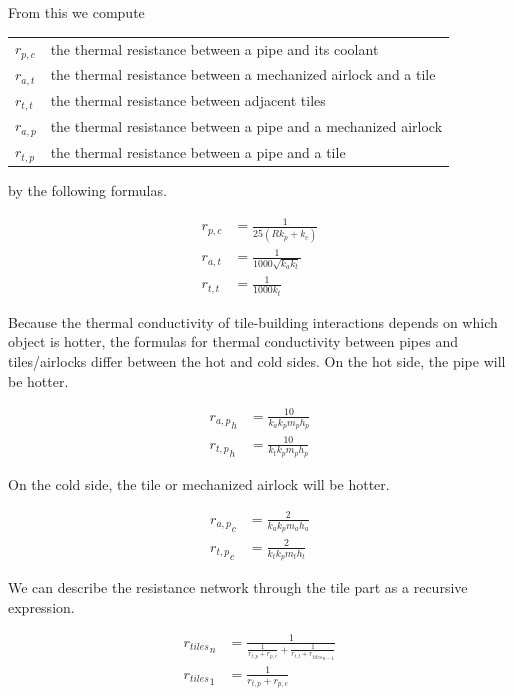 \documentclass{article}
\numberwithin{equation}{subsection}
\theoremstyle{remark}
\newenvironment{definitiontable}{
\renewcommand{\arraystretch}{1.5}
\begin{tabular}{lp{0.8\textwidth}}
}
{
\end{tabular}
\renewcommand{\arraystretch}{1.0}
}
\begin{document}
From this we compute

\begin{definitiontable}
\(r_{p,c}\) & the thermal resistance between a pipe and its coolant \\

\(r_{a,t}\) & the thermal resistance between a mechanized airlock and a tile \\

\(r_{t,t}\) & the thermal resistance between adjacent tiles \\

\(r_{a,p}\) & the thermal resistance between a pipe and a mechanized airlock \\

\(r_{t,p}\) & the thermal resistance between a pipe and a tile
\end{definitiontable}

by the following formulas.

\begin{align}
r_{p,c} &= \frac{1}{25 \left(R k_{p} + k_{c}\right)} \\
r_{a,t} &= \frac{1}{1000 \sqrt{k_{a} k_{t}}} \\
r_{t,t} &= \frac{1}{1000 k_{t}}
\end{align}

Because the thermal conductivity of tile-building interactions depends on which object is hotter, the formulas for thermal conductivity between pipes and tiles/airlocks differ between the hot and cold sides.
On the hot side, the pipe will be hotter.

\begin{align}
{r_{a,p}}_{h} &= \frac{10}{k_{a} k_{p} m_{p} h_{p}} \\
{r_{t,p}}_{h} &= \frac{10}{k_{t} k_{p} m_{p} h_{p}}
\end{align}

On the cold side, the tile or mechanized airlock will be hotter.

\begin{align}
{r_{a,p}}_{c} &= \frac{2}{k_{a} k_{p} m_{a} h_{a}} \\
{r_{t,p}}_{c} &= \frac{2}{k_{t} k_{p} m_{t} h_{t}}
\end{align}

We can describe the resistance network through the tile part as a recursive expression.

\begin{align}
{r_{tiles}}_{n} &= \frac{1}{\frac{1}{r_{t,p} + r_{p,c}} + \frac{1}{r_{t,t} + {r_{tiles}}_{n - 1}}} \\
{r_{tiles}}_{1} &= \frac{1}{r_{t,p} + r_{p,c}}
\end{align}
\end{document}
